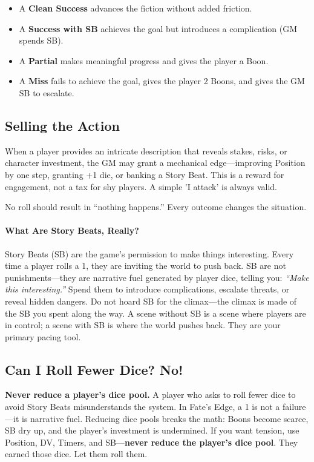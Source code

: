 \begin{itemize}
  \item A \textbf{Clean Success} advances the fiction without added friction.
  \item A \textbf{Success with SB} achieves the goal but introduces a complication (GM spends SB).
  \item A \textbf{Partial} makes meaningful progress and gives the player a Boon.
  \item A \textbf{Miss} fails to achieve the goal, gives the player 2 Boons, and gives the GM SB to escalate.
\end{itemize}

\subsection{Selling the Action}

When a player provides an intricate description that reveals stakes, risks, or character investment, the GM may grant a mechanical edge---improving Position by one step, granting +1 die, or banking a Story Beat. This is a reward for engagement, not a tax for shy players. A simple 'I attack' is always valid.

No roll should result in ``nothing happens.'' Every outcome changes the situation.

\paragraph{What Are Story Beats, Really?}
Story Beats (SB) are the game's permission to make things interesting. Every time a player rolls a 1, they are inviting the world to push back. SB are not punishments---they are narrative fuel generated by player dice, telling you: \textit{``Make this interesting.''} Spend them to introduce complications, escalate threats, or reveal hidden dangers. Do not hoard SB for the climax---the climax is made of the SB you spent along the way. A scene without SB is a scene where players are in control; a scene with SB is where the world pushes back. They are your primary pacing tool.

\subsection{Can I Roll Fewer Dice? No!}
\label{sub:why-no-fewer-dice}

\textbf{Never reduce a player's dice pool.} A player who asks to roll fewer dice to avoid Story Beats misunderstands the system. In Fate's Edge, a 1 is not a failure---it is narrative fuel. Reducing dice pools breaks the math: Boons become scarce, SB dry up, and the player's investment is undermined. If you want tension, use Position, DV, Timers, and SB---\textbf{never reduce the player's dice pool}. They earned those dice. Let them roll them.